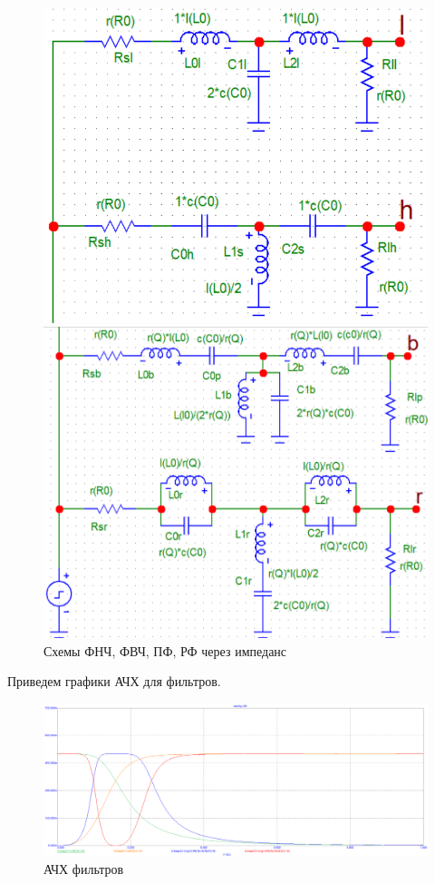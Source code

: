 \documentclass[12pt,a4paper]{article}
\begin{document}
	\begin{figure}[H]
		\centering
		\begin{minipage}[b]{.5\textwidth}
			\includegraphics[width=0.9\linewidth]{res/imp3p_lh.png}
		\end{minipage}%
		\begin{minipage}[b]{.5\textwidth}
			\includegraphics[width=0.9\linewidth]{res/imp3p_br.png}
		\end{minipage}
		\caption*{Схемы ФНЧ, ФВЧ, ПФ, РФ через импеданс}
	\end{figure}

	Приведем графики АЧХ для фильтров.

	\begin{figure}[H]
		\centering
		\includegraphics[width=1.0\linewidth]{res/adm3p_ach.png}
		\caption{АЧХ фильтров}
		\label{ach}
	\end{figure}
	
\end{document}
